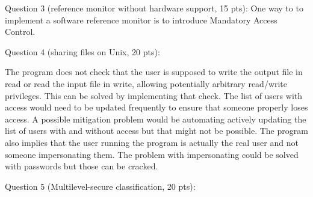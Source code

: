 \documentclass[11pt]{article}
\begin{document}
Question 3 (reference monitor without hardware support, 15 pts):
One way to to implement a software reference monitor is to introduce Mandatory Access Control. 

\newpage

Question 4 (sharing files on Unix, 20 pts):

The program does not check that the user is supposed to write the output file in read or read the input file in write, allowing potentially arbitrary read/write privileges. This can be solved by implementing that check.
The list of users with access would need to be updated frequently to ensure that someone properly loses access. A possible mitigation problem would be automating actively updating the list of users with and without access but that might not be possible.
The program also implies that the user running the program is actually the real user and not someone impersonating them. The problem with impersonating could be solved with passwords but those can be cracked.
\newpage

Question 5 (Multilevel-secure classification, 20 pts):
\end{document}
